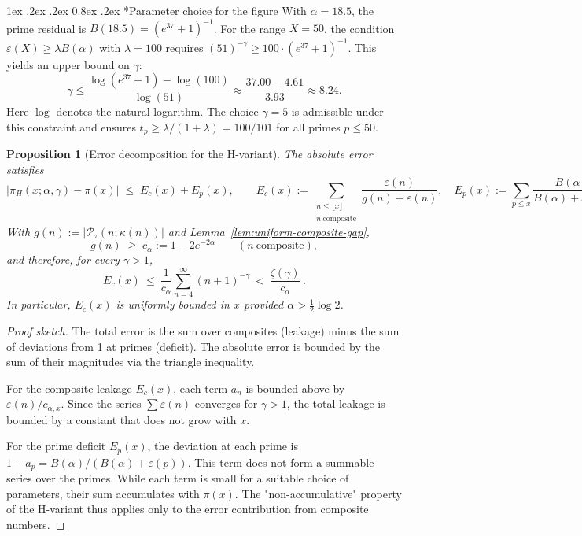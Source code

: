 \documentclass[11pt,a4paper]{amsart}
\makeatletter
\renewcommand\paragraph{\@startsection{paragraph}{4}{\z@}%
  {1ex \@plus .2ex \@minus .2ex}%
  {0.8ex \@plus .2ex}%
  {\normalfont\bfseries}}
\theoremstyle{plain}
\newtheorem{proposition}[theorem]{Proposition}
\theoremstyle{definition}
\theoremstyle{remark}
\makeatother
\begin{document}
\paragraph*{Parameter choice for the figure}
With $\alpha=18.5$, the prime residual is $B(18.5)=(e^{37}+1)^{-1}$. For the range $X=50$, the condition $\varepsilon(X) \ge \lambda B(\alpha)$ with $\lambda=100$ requires $(51)^{-\gamma} \ge 100 \cdot (e^{37}+1)^{-1}$. This yields an upper bound on $\gamma$:
\[
\gamma \le \frac{\log(e^{37}+1) - \log(100)}{\log(51)} \approx \frac{37.00 - 4.61}{3.93} \approx 8.24.
\]
Here $\log$ denotes the natural logarithm. The choice $\gamma=5$ is admissible under this constraint and ensures $t_p \ge \lambda/(1+\lambda) = 100/101$ for all primes $p\le 50$.

\begin{proposition}[Error decomposition for the H-variant]
The absolute error satisfies
\[
\bigl| \pi_H(x;\alpha,\gamma) - \pi(x) \bigr|
\;\le\; E_c(x) + E_p(x),
\qquad
E_c(x):=\sum_{\substack{n\le \lfloor x\rfloor \\ n\ \mathrm{composite}}}\frac{\varepsilon(n)}{g(n)+\varepsilon(n)},
\quad
E_p(x):=\sum_{p\le x}\frac{B(\alpha)}{B(\alpha)+\varepsilon(p)}.
\]
With $g(n):=\bigl|\mathcal P_\tau(n;\kappa(n))\bigr|$ and Lemma~\ref{lem:uniform-composite-gap},
\[
g(n)\;\ge\; c_\alpha:=1-2e^{-2\alpha}\qquad(n\ \mathrm{composite}),
\]
and therefore, for every $\gamma>1$,
\[
E_c(x)\ \le\ \frac{1}{c_\alpha}\sum_{n=4}^{\infty}(n+1)^{-\gamma}\ <\ \frac{\zeta(\gamma)}{c_\alpha}\,.
\]
In particular, $E_c(x)$ is uniformly bounded in $x$ provided $\alpha>\tfrac12\log 2$.
\end{proposition}

\begin{proof}[Proof sketch]
The total error is the sum over composites (leakage) minus the sum of deviations from 1 at primes (deficit). The absolute error is bounded by the sum of their magnitudes via the triangle inequality.

For the composite leakage $E_c(x)$, each term $a_n$ is bounded above by $\varepsilon(n)/c_{\alpha,x}$. Since the series $\sum \varepsilon(n)$ converges for $\gamma>1$, the total leakage is bounded by a constant that does not grow with $x$.

For the prime deficit $E_p(x)$, the deviation at each prime is $1-a_p = B(\alpha)/(B(\alpha)+\varepsilon(p))$. This term does not form a summable series over the primes. While each term is small for a suitable choice of parameters, their sum accumulates with $\pi(x)$. The "non-accumulative" property of the H-variant thus applies only to the error contribution from composite numbers.
\end{proof}
\end{document}
